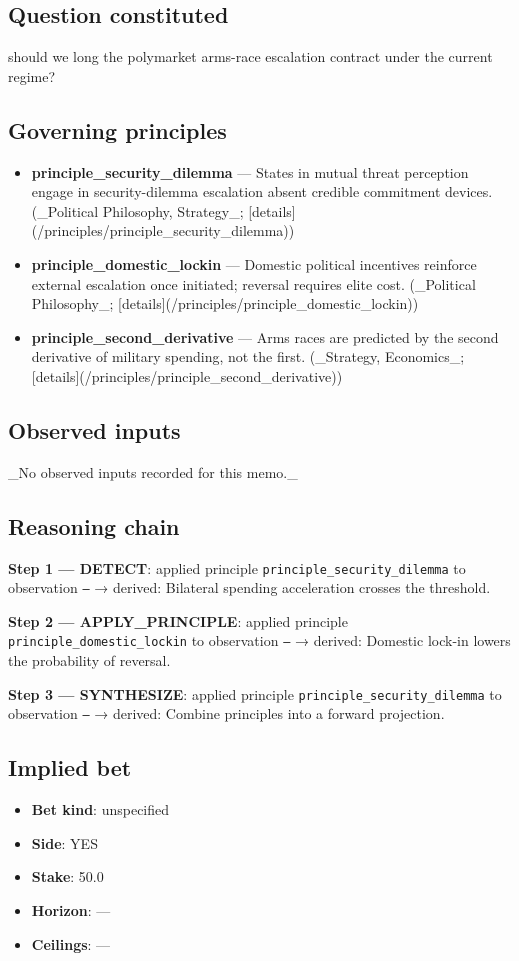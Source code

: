 \subsection*{Question constituted}
should we long the polymarket arms-race escalation contract under the current regime?

\subsection*{Governing principles}
\begin{itemize}
\item \textbf{principle\_security\_dilemma} — States in mutual threat perception engage in security-dilemma escalation absent credible commitment devices. (\_Political Philosophy, Strategy\_; [details](/principles/principle\_security\_dilemma))
\item \textbf{principle\_domestic\_lockin} — Domestic political incentives reinforce external escalation once initiated; reversal requires elite cost. (\_Political Philosophy\_; [details](/principles/principle\_domestic\_lockin))
\item \textbf{principle\_second\_derivative} — Arms races are predicted by the second derivative of military spending, not the first. (\_Strategy, Economics\_; [details](/principles/principle\_second\_derivative))
\end{itemize}

\subsection*{Observed inputs}
\_No observed inputs recorded for this memo.\_

\subsection*{Reasoning chain}
\textbf{Step 1 — DETECT}: applied principle \texttt{principle\_security\_dilemma} to observation \texttt{—} → derived: Bilateral spending acceleration crosses the threshold.

\textbf{Step 2 — APPLY\_PRINCIPLE}: applied principle \texttt{principle\_domestic\_lockin} to observation \texttt{—} → derived: Domestic lock-in lowers the probability of reversal.

\textbf{Step 3 — SYNTHESIZE}: applied principle \texttt{principle\_security\_dilemma} to observation \texttt{—} → derived: Combine principles into a forward projection.

\subsection*{Implied bet}
\begin{itemize}
\item \textbf{Bet kind}: unspecified
\item \textbf{Side}: YES
\item \textbf{Stake}: 50.0
\item \textbf{Horizon}: —
\item \textbf{Ceilings}: —
\end{itemize}

